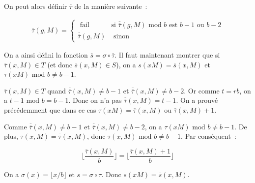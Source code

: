     On peut alors définir $\overline{\tau}$ de la manière suivante~:

    \begin{align*}
      \overline{\tau}(g,M) =
      \begin{cases}
        \text{\ fail } & \text{si } \overline{\overline{\tau}}(g,M) \text{\ mod $b$ est $b - 1$ ou $b - 2$} \\
        \overline{\overline{\tau}}(g,M)  & \text{ sinon}
      \end{cases}
    \end{align*}

     On a ainsi défini la fonction $\overline{s} = \sigma \circ \overline{\tau}$.  Il faut maintenant montrer que si $\overline{\tau}(x,M) \in T$ (et donc $\overline{s}(x,M) \in S$), on a $s(xM)=\overline{s}(x,M)$ et $\tau(xM) \text{\ mod } b \neq b - 1$.

     $\overline{\tau}(x,M) \in T$ quand $\overline{\overline{\tau}}(x,M) \neq b - 1$ et $\overline{\overline{\tau}}(x,M) \neq b - 2$. Or comme $t = rb$, on a $t - 1 \text{\ mod } b = b - 1$. Donc on n'a pas $\overline{\overline{\tau}}(x,M) = t - 1$. On a prouvé précédemment que dans ce cas $\tau(xM) = \overline{\overline{\tau}}(x,M)$ ou $\overline{\overline{\tau}}(x,M) + 1$.

     Comme $\overline{\overline{\tau}}(x,M) \neq b - 1$ et $\overline{\overline{\tau}}(x,M) \neq b - 2$, on a $\tau(xM) \text{\ mod } b \neq b - 1$. De plus, $\overline{\tau}(x,M) = \overline{\overline{\tau}}(x,M)$, donc $\overline{\tau}(x,M) \text{\ mod } b \neq b - 1$. Par conséquent~:

     $$\lfloor \frac{\overline{\tau}(x,M)}{b} \rfloor = \lfloor \frac{\overline{\tau}(x,M) + 1}{b} \rfloor$$

     On a $\sigma(x) = \lfloor x/b \rfloor$ et $s= \sigma \circ \tau$. Donc $s(xM) = \overline{s}(x,M)$.
